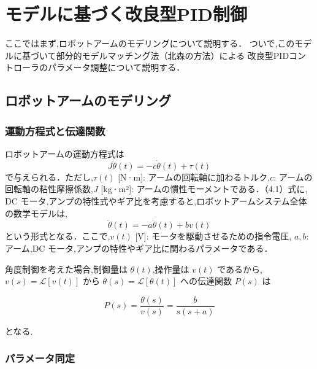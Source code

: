 
\section{モデルに基づく改良型PID制御}

ここではまず,ロボットアームのモデリングについて説明する．
ついで,このモデルに基づいて部分的モデルマッチング法（北森の方法）による
改良型PIDコントローラのパラメータ調整について説明する．

\subsection{ロボットアームのモデリング}
\subsubsection{運動方程式と伝達関数}
ロボットアームの運動方程式は
\begin{equation}
  J \ddot{\theta}(t) = -c \dot{\theta}(t) + \tau(t)
  \tag{4.1}
\end{equation}
で与えられる．ただし,$\tau(t)$ [N·m]: アームの回転軸に加わるトルク,$c$: アームの回転軸の粘性摩擦係数,$J$ [kg·m²]: アームの慣性モーメントである．（4.1）式に,
DC モータ,アンプの特性式やギア比を考慮すると,ロボットアームシステム全体の数学モデルは,
\begin{equation}
  \ddot{\theta}(t) = -a \dot{\theta}(t) + b v(t)
  \tag{4.2}
\end{equation}
という形式となる．ここで,$v(t)$ [V]: モータを駆動させるための指令電圧,
$a, b$: アーム,DC モータ,アンプの特性やギア比に関わるパラメータである．

角度制御を考えた場合,制御量は $\theta(t)$,操作量は $v(t)$ であるから,
$v(s) = \mathcal{L}[v(t)]$ から $\theta(s) = \mathcal{L}[\theta(t)]$ への伝達関数 
$P(s)$ は

\begin{equation}
  P(s) = \frac{\theta(s)}{v(s)} = \frac{b}{s(s+a)}
  \tag{4.3}
\end{equation}

となる.

\subsubsection{パラメータ同定}

